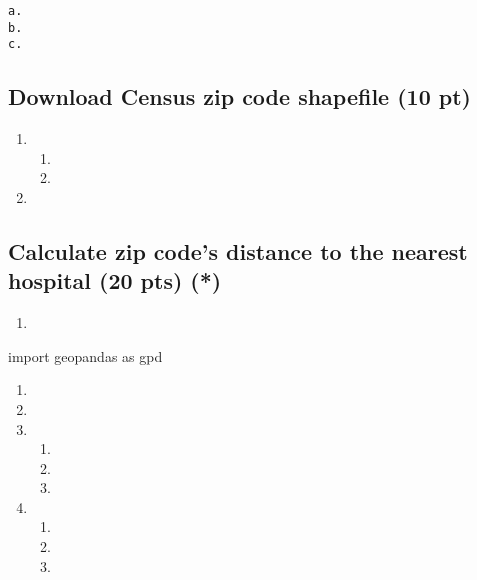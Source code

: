 \documentclass[
  letterpaper,
  DIV=11,
  numbers=noendperiod]{scrartcl}
\newenvironment{Shaded}{\begin{snugshade}}{\end{snugshade}}
\newcommand{\ImportTok}[1]{\textcolor[rgb]{0.00,0.46,0.62}{#1}}
\newcommand{\NormalTok}[1]{\textcolor[rgb]{0.00,0.23,0.31}{#1}}
\providecommand{\tightlist}{%
  \setlength{\itemsep}{0pt}\setlength{\parskip}{0pt}}\usepackage{longtable,booktabs,array}
\begin{document}
\begin{verbatim}
a.
b.
c.
\end{verbatim}

\subsection{Download Census zip code shapefile (10
pt)}\label{download-census-zip-code-shapefile-10-pt}

\begin{enumerate}
\def\labelenumi{\arabic{enumi}.}
\tightlist
\item
  \begin{enumerate}
  \def\labelenumii{\alph{enumii}.}
  \tightlist
  \item
  \item
  \end{enumerate}
\item
\end{enumerate}

\subsection{Calculate zip code's distance to the nearest hospital (20
pts)
(*)}\label{calculate-zip-codes-distance-to-the-nearest-hospital-20-pts}

\begin{enumerate}
\def\labelenumi{\arabic{enumi}.}
\tightlist
\item
\end{enumerate}

\begin{Shaded}
\begin{Highlighting}[]
\ImportTok{import}\NormalTok{ geopandas }\ImportTok{as}\NormalTok{ gpd}
\end{Highlighting}
\end{Shaded}

\begin{enumerate}
\def\labelenumi{\arabic{enumi}.}
\setcounter{enumi}{1}
\tightlist
\item
\item
\item
  \begin{enumerate}
  \def\labelenumii{\alph{enumii}.}
  \tightlist
  \item
  \item
  \item
  \end{enumerate}
\item
  \begin{enumerate}
  \def\labelenumii{\alph{enumii}.}
  \tightlist
  \item
  \item
  \item
  \end{enumerate}
\end{enumerate}
\end{document}
